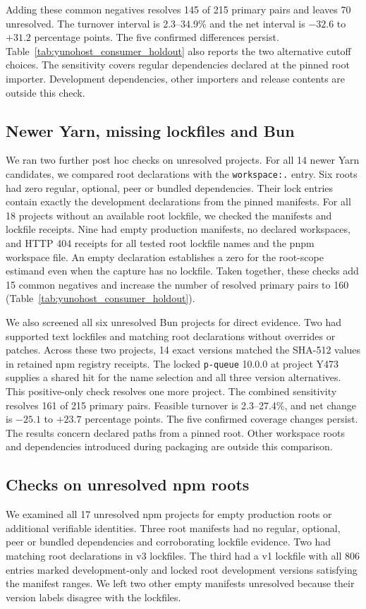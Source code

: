 Adding these common negatives resolves 145 of 215 primary pairs and
leaves 70 unresolved. The turnover interval is 2.3--34.9\% and the net
interval is $-32.6$ to $+31.2$ percentage points. The five confirmed
differences persist. Table~\ref{tab:yunohost_consumer_holdout} also
reports the two alternative cutoff choices. The sensitivity covers
regular dependencies declared at the pinned root importer. Development
dependencies, other importers and release contents are outside this check.

\subsection{Newer Yarn, missing lockfiles and Bun}
We ran two further post hoc checks on unresolved projects. For all 14
newer Yarn candidates, we compared root declarations with the
\texttt{workspace:.} entry. Six roots had zero regular, optional,
peer or bundled dependencies. Their lock entries contain exactly the
development declarations from the pinned manifests. For all 18
projects without an available root lockfile, we checked the manifests
and lockfile receipts. Nine had empty production manifests, no declared
workspaces, and HTTP 404 receipts for all tested root lockfile names and
the pnpm workspace file. An empty declaration establishes a zero for
the root-scope estimand even when the capture has no lockfile. Taken
together, these checks add 15 common negatives and increase the number
of resolved primary pairs to 160 (Table~\ref{tab:yunohost_consumer_holdout}).

We also screened all six unresolved Bun projects for direct evidence.
Two had supported text lockfiles and matching root declarations
without overrides or patches. Across these two projects, 14 exact
versions matched the SHA-512 values in retained npm registry receipts.
The locked \texttt{p-queue} 10.0.0 at project Y473 supplies a
shared hit for the name selection and all three version alternatives.
This positive-only check resolves one more project. The combined
sensitivity resolves 161 of 215 primary pairs. Feasible turnover is
2.3--27.4\%, and net change is $-25.1$ to $+23.7$ percentage points.
The five confirmed coverage changes persist. The results concern
declared paths from a pinned root. Other workspace roots and
dependencies introduced during packaging are outside this comparison.

\subsection{Checks on unresolved npm roots}
We examined all 17 unresolved npm projects for empty production
roots or additional verifiable identities. Three root manifests had no
regular, optional, peer or bundled dependencies and corroborating
lockfile evidence. Two had matching root declarations in v3 lockfiles.
The third had a v1 lockfile with all 806 entries marked
development-only and locked root development versions satisfying the
manifest ranges. We left two other empty manifests unresolved because
their version labels disagree with the lockfiles.

